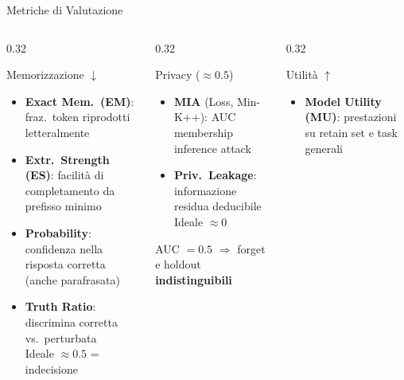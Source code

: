 \documentclass[aspectratio=169,11pt]{beamer}
\begin{document}
\begin{frame}{Metriche di Valutazione}
  \vspace{-0.3em}
  \begin{columns}[T]
    \begin{column}{0.32\textwidth}
      \begin{block}{\small Memorizzazione $\downarrow$}
        \scriptsize
        \begin{itemize}\setlength{\itemsep}{2pt}
          \item \textbf{Exact Mem.\ (EM)}: fraz.\ token riprodotti letteralmente
          \item \textbf{Extr.\ Strength (ES)}: facilit\`a di completamento da prefisso minimo
          \item \textbf{Probability}: confidenza nella risposta corretta (anche parafrasata)
          \item \textbf{Truth Ratio}: discrimina corretta vs.\ perturbata\\
                {\tiny Ideale $\approx 0.5$ = indecisione}
        \end{itemize}
      \end{block}
    \end{column}
    \begin{column}{0.32\textwidth}
      \begin{block}{\small Privacy ($\approx\!0.5$)}
        \scriptsize
        \begin{itemize}\setlength{\itemsep}{2pt}
          \item \textbf{MIA} (Loss, Min-K++): AUC membership inference attack
          \item \textbf{Priv.\ Leakage}: informazione residua deducibile\\
                {\tiny Ideale $\approx 0$}
        \end{itemize}
        \vspace{0.3em}
        \scriptsize AUC $= 0.5$ $\Rightarrow$ forget e holdout \textbf{indistinguibili}
      \end{block}
    \end{column}
    \begin{column}{0.32\textwidth}
      \begin{block}{\small Utilit\`a $\uparrow$}
        \scriptsize
        \begin{itemize}\setlength{\itemsep}{2pt}
          \item \textbf{Model Utility (MU)}: prestazioni su retain set e task generali

\end{itemize}
\end{block}
\end{column}
\end{columns}
\end{frame}
\end{document}
